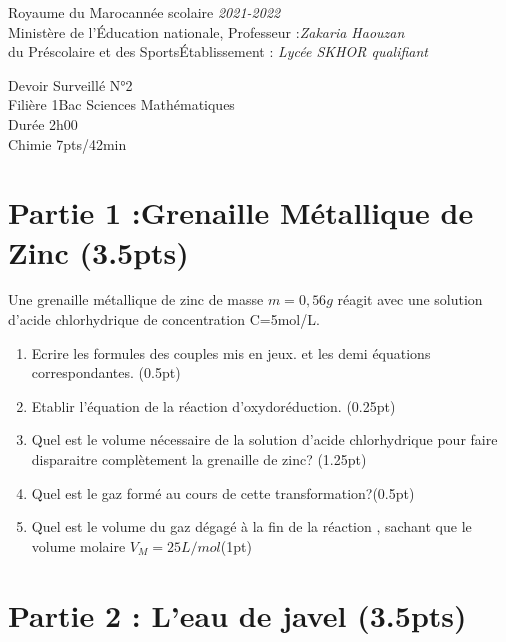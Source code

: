 \documentclass[12pt]{article}
\newcommand\headerMe[2]{\noindent{}#1\hfill#2}
\begin{document}
\headerMe{Royaume du Maroc}{année scolaire \emph{2021-2022}}\\
\headerMe{Ministère de l'Éducation nationale, }{  Professeur :\emph{Zakaria Haouzan}}\\
\headerMe{du Préscolaire et des Sports}{Établissement : \emph{Lycée SKHOR qualifiant}}\\

\begin{center}
Devoir Surveillé  N°2 \\
    Filière 1Bac Sciences Mathématiques \\
Durée 2h00
\\
    \vspace{.2cm}
\hrulefill
\Large{Chimie 7pts/42min}
\hrulefill\\

\end{center}

 \section*{Partie 1 :Grenaille Métallique de Zinc \dotfill(3.5pts) }
Une grenaille métallique de zinc de masse $m=0,56g$ réagit avec une solution d'acide chlorhydrique de
concentration C=5mol/L.
\begin{enumerate}

  \item  Ecrire les formules des couples mis en jeux. et les demi équations correspondantes. \dotfill(0.5pt)

  \item Etablir l'équation de la réaction d'oxydoréduction. \dotfill(0.25pt)


  \item Quel est le volume nécessaire de la solution d'acide chlorhydrique pour faire disparaitre complètement la
    grenaille de zinc? \dotfill(1.25pt)

  \item Quel est le gaz formé au cours de cette transformation?\dotfill(0.5pt)

  \item  Quel est le volume du gaz dégagé à la fin de la réaction , sachant que le volume molaire $V_M=25L/mol$\dotfill(1pt)
\end{enumerate}

\section*{Partie 2 : L’eau de javel \dotfill(3.5pts) }
\end{document}
